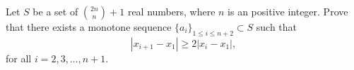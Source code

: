 Let $S$ be a set of $\displaystyle { 2n \choose n } + 1$ real numbers, where $n$ is an positive integer. Prove that there exists a monotone sequence $\{a_i\}_{1\leq i \leq n+2} \subset S$ such that
\[ |x_{i+1} - x_1 | \geq 2 | x_i - x_1 | , \]
for all $i=2,3,\ldots, n+1$.